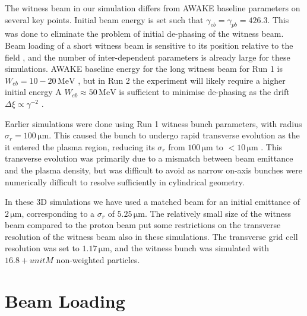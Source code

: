 \documentclass[aps,prstab,reprint,amsmath,amssymb,groupedaddress]{revtex4-1}
\newcommand{\unit}[1]{\,\mathrm{#1}}
\begin{document}
The witness beam in our simulation differs from AWAKE baseline parameters on several key points. Initial beam energy is
set such that $\gamma_{eb} = \gamma_{pb} = 426.3$. This was done to eliminate the problem of initial de-phasing of the
witness beam. Beam loading of a short witness beam is sensitive to its position relative to the field
\cite{tzoufras:2009}, and the number of inter-dependent parameters is already large for these simulations. AWAKE
baseline energy for the long witness beam for Run 1 is $W_{eb} = 10-20\unit{MeV}$ \cite{gschwendtner:2016}, but in Run 2
the experiment will likely require a higher initial energy A $W_{eb} \approx 50\unit{MeV}$ is sufficient to minimise
de-phasing as the drift $\Delta\xi \propto \gamma^{-2}$ \cite{berglyd_olsen:2015}.

Earlier simulations were done using Run 1 witness bunch parameters, with radius $\sigma_{r} = 100\unit{\mu m}$. This
caused the bunch to undergo rapid transverse evolution as the it entered the plasma region, reducing its $\sigma_{r}$
from $100\unit{\mu m}$ to $< 10\unit{\mu m}$ \cite{berglyd_olsen:2016}. This transverse evolution was primarily due to a
mismatch between beam emittance and the plasma density, but was difficult to avoid as narrow on-axis bunches were
numerically difficult to resolve sufficiently in cylindrical geometry.

In these 3D simulations we have used a matched beam for an initial emittance of $2\unit{\mu m}$, corresponding to a
$\sigma_{r}$ of $5.25\unit{\mu m}$. The relatively small size of the witness beam compared to the proton beam put some
restrictions on the transverse resolution of the witness beam also in these simulations. The transverse grid cell
resolution was set to $1.17\unit{\mu m}$, and the witness bunch was simulated with $16.8+unit{M}$ non-weighted
particles.

\section[\label{S:BL}]{Beam Loading}
\end{document}
